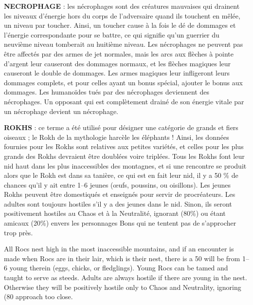\label{monstre-necrophage}\textbf{NECROPHAGE} : les nécrophages sont des créatures mauvaises qui drainent les niveaux d'énergie hors du corps de l'adversaire quand ils touchent en mêlée, un niveau par toucher. Ainsi, un toucher cause à la fois le dé de dommages et l'énergie correspondante pour se battre, ce qui signifie qu'un guerrier du neuvième niveau tomberait au huitième niveau. Les nécrophages ne peuvent pas être affectés par des armes de jet normales, mais les arcs aux flèches à pointe d'argent leur causeront des dommages normaux, et les flèches magiques leur causeront le double de dommages. Les armes magiques leur infligeront leurs dommages complets, et pour celles ayant un bonus spécial, ajouter le bonus aux dommages. Les humanoïdes tués par des nécrophages deviennent des nécrophages. Un opposant qui est complètement drainé de son énergie vitale par un nécrophage devient un nécrophage.

\label{monstre-rokh}\textbf{ROKHS} : ce terme a été utilisé pour désigner une catégorie de grands et fiers oiseaux ; le Rokh de la mythologie harcèle les éléphants ! Ainsi, les données fournies pour les Rokhs sont relatives aux petites variétés, et celles pour les plus grands des Rokhs devraient être doublées voire triplées. Tous les Rokhs font leur nid haut dans les plus inaccessibles des montagnes, et si une rencontre se produit alors que le Rokh est dans sa tanière, ce qui est en fait leur nid, il y a 50 \% de chances qu'il y ait entre 1--6 jeunes (œufs, poussins, ou oisillons). Les jeunes Rokhs peuvent être domestiqués et enseignés pour servir de procréateurs. Les adultes sont toujours hostiles s'il y a des jeunes dans le nid. Sinon, ils seront positivement hostiles au Chaos et à la Neutralité, ignorant (80\%) ou étant amicaux (20\%) envers les personnages Bons qui ne tentent pas de s'approcher trop près.



 All Rocs nest high in the most inaccessible mountains, and if an encounter
is made when Rocs are in their lair, which is their nest, there is a 50%
will be from 1–6 young therein (eggs, chicks, or ﬂedglings). Young Rocs can be
tamed and taught to serve as steeds. Adults are always hostile if there are young
in the nest. Otherwise they will be positively hostile only to Chaos and Neutrality,
ignoring (80%
approach too close.





